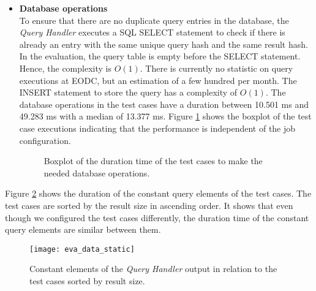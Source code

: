 \documentclass[draft,final]{vutinfth} %
\begin{document}
\begin{itemize}
	\item \textbf{Database operations} \\
	To ensure that there are no duplicate query entries in the database, the \textit{Query Handler} executes a SQL SELECT statement to check if there is already an entry with the same unique query hash and the same result hash. In the evaluation, the query table is empty before the SELECT statement. Hence, the complexity is $O(1)$. {There is currently no statistic on query executions at EODC, but an estimation of a few hundred per month.} The INSERT statement to store the query has a complexity of $O(1)$. The database operations in the test cases have a duration between 10.501 ms and 49.283 ms with a median of 13.377 ms. Figure \ref{fig:evaluation_perf_data_database} shows the boxplot of the test case executions indicating that the performance is independent of the job configuration.  
	\begin{figure}[!h]
		\centering
		\caption{Boxplot of the duration time of the test cases to make the needed database operations.}
		\label{fig:evaluation_perf_data_database}	
	\end{figure}
\end{itemize}

Figure \ref{fig:eva_data_static} shows the duration of the constant query elements of the test cases. The test cases are sorted by the result size in ascending order. It shows that even though we configured the test cases differently, the duration time of the constant query elements are similar between them. 

\begin{figure}[h]
	\centering
	\texttt{[image: eva\_data\_static]}
	\caption{Constant elements of the \textit{Query Handler} output in relation to the test cases sorted by result size.}
	\label{fig:eva_data_static} %
\end{figure}
\end{document}
